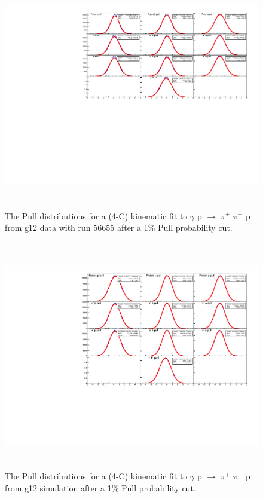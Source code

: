\documentclass[12pt,a4paper]{amsbook}
\theoremstyle{definition}
\begin{document}
{\begin{figure}[ht!]
\centerline{
\includegraphics[width=12cm,height=10cm]{Pulls_nothing.pdf}}
\caption{The Pull distributions for a (4-C) kinematic fit to $\gamma$ p $\rightarrow$ $\pi^{+}$ $\pi^{-}$ p from g12 data with run 56655 after a 1$\%$ Pull probability cut.}
\label{Fig3}
\end{figure}

\begin{figure}[ht!]
\centerline{
\includegraphics[width=12cm,height=10cm]{SIM_Pulls_nothing.pdf}}
\caption{The Pull distributions for a (4-C) kinematic fit to $\gamma$ p $\rightarrow$ $\pi^{+}$ $\pi^{-}$ p from g12 simulation after a 1$\%$ Pull probability cut.}
\label{Fig4}
\end{figure}
  
}
\end{document}
